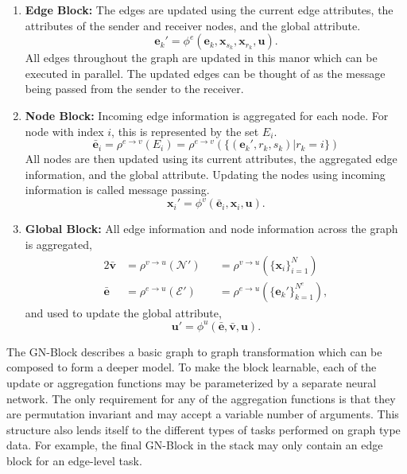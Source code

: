 \begin{enumerate}
    \item \textbf{Edge Block:} The edges are updated using the current edge attributes, the attributes of the sender and receiver nodes, and the global attribute.
    \begin{equation}
        \mathbf{e}_k' = \phi^e(\mathbf{e}_k, \mathbf{x}_{s_k}, \mathbf{x}_{r_k}, \mathbf{u}).
    \end{equation}
    All edges throughout the graph are updated in this manor which can be executed in parallel.
    The updated edges can be thought of as the message being passed from the sender to the receiver.
    \item \textbf{Node Block:} Incoming edge information is aggregated for each node.
    For node with index $i$, this is represented by the set $E_i$.
    \begin{equation}
        \mathbf{\bar{e}}_i = \rho^{e \to v}(E_i) = \rho^{e \to v}\left(\{(\mathbf{e}_k', r_k, s_k) | r_k = i\}\right)
    \end{equation}
    All nodes are then updated using its current attributes, the aggregated edge information, and the global attribute.
    Updating the nodes using incoming information is called message passing.
    \begin{equation}
        \mathbf{x}_i' = \phi^v(\mathbf{\bar{e}}_i, \mathbf{x}_i, \mathbf{u}).
    \end{equation}
    \item \textbf{Global Block:} All edge information and node information across the graph is aggregated,
    \begin{alignat}{2}
        \mathbf{\bar{v}} &= \rho^{v \to u}(\mathcal{N}') &&= \rho^{v \to u}(\{\mathbf{x}_i\}_{i=1}^{N}) \\
        \mathbf{\bar{e}} &= \rho^{e \to u}(\mathcal{E}') &&= \rho^{e \to u}(\{\mathbf{e}_k'\}_{k=1}^{N^e}),
    \end{alignat}
    and used to update the global attribute,
    \begin{equation}
        \mathbf{u}' = \phi^u( \mathbf{\bar{e}}, \mathbf{\bar{v}}, \mathbf{u}).
    \end{equation}
\end{enumerate}

The GN-Block describes a basic graph to graph transformation which can be composed to form a deeper model.
To make the block learnable, each of the update or aggregation functions may be parameterized by a separate neural network.
The only requirement for any of the aggregation functions is that they are permutation invariant and may accept a variable number of arguments.
This structure also lends itself to the different types of tasks performed on graph type data.
For example, the final GN-Block in the stack may only contain an edge block for an edge-level task.

